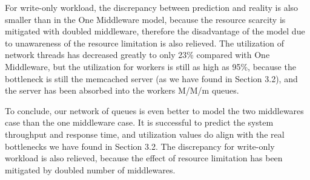 For write-only workload, the discrepancy between prediction and reality is also smaller than in the One Middleware model, because the resource scarcity is mitigated with doubled middleware, therefore the disadvantage of the model due to unawareness of the resource limitation is also relieved. The utilization of network threads has decreased greatly to only 23\% compared with One Middleware, but the utilization for workers is still as high as 95\%, because the bottleneck is still the memcached server (as we have found in Section 3.2), and the server has been absorbed into the workers M/M/m queues. 

To conclude, our network of queues is even better to model the two middlewares case than the one middleware case. It is successful to predict the system throughput and response time, and utilization values do align with the real bottlenecks we have found in Section 3.2. The discrepancy for write-only workload is also relieved, because the effect of resource limitation has been mitigated by doubled number of middlewares.